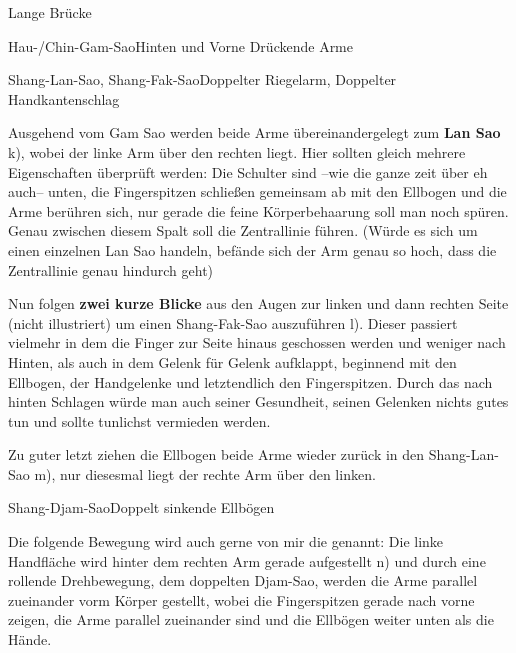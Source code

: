 \begin{WTSatz}{Lange Br\"ucke}
\begin{WTSatzTeil}{Hau-/Chin-Gam-Sao}{Hinten und Vorne Dr\"uckende Arme}
	\end{WTSatzTeil}
	\begin{WTSatzTeil}{Shang-Lan-Sao, Shang-Fak-Sao}{Doppelter Riegelarm, Doppelter Handkantenschlag}
		
		Ausgehend vom Gam Sao werden beide Arme \"ubereinandergelegt zum \textbf{Lan Sao} k), wobei der linke Arm \"uber den rechten liegt. Hier sollten gleich mehrere Eigenschaften \"uberpr\"uft werden: Die Schulter sind --wie die ganze zeit \"uber eh auch-- unten, die Fingerspitzen schlie{\ss}en gemeinsam ab mit den Ellbogen und die Arme ber\"uhren sich, nur gerade die feine K\"orperbehaarung soll man noch sp\"uren. Genau zwischen diesem Spalt soll die Zentrallinie f\"uhren. (W\"urde es sich um einen einzelnen Lan Sao handeln, bef\"ande sich der Arm genau so hoch, dass die Zentrallinie genau hindurch geht)
		
		Nun folgen \textbf{zwei kurze Blicke} aus den Augen zur linken und dann rechten Seite (nicht illustriert) um einen Shang-Fak-Sao auszuf\"uhren l). Dieser passiert vielmehr in dem die Finger zur Seite hinaus geschossen werden und weniger nach Hinten, als auch in dem Gelenk f\"ur Gelenk aufklappt, beginnend mit den Ellbogen, der Handgelenke und letztendlich den Fingerspitzen. Durch das nach hinten Schlagen w\"urde man auch seiner Gesundheit, seinen Gelenken nichts gutes tun und sollte tunlichst vermieden werden.
		
		Zu guter letzt ziehen die Ellbogen beide Arme wieder zur\"uck in den Shang-Lan-Sao m), nur diesesmal liegt der rechte Arm \"uber den linken.
		
	\end{WTSatzTeil}
	\begin{WTSatzTeil}{Shang-Djam-Sao}{Doppelt sinkende Ellb\"ogen}
		
		Die folgende Bewegung wird auch gerne von mir die  genannt: Die linke Handfl\"ache wird hinter dem rechten Arm gerade aufgestellt n) und durch eine rollende Drehbewegung, dem doppelten Djam-Sao, werden die Arme parallel zueinander vorm K\"orper gestellt, wobei die Fingerspitzen gerade nach vorne zeigen, die Arme parallel zueinander sind und die Ellb\"ogen weiter unten als die H\"ande.
		
	\end{WTSatzTeil}
	

\end{WTSatz}
